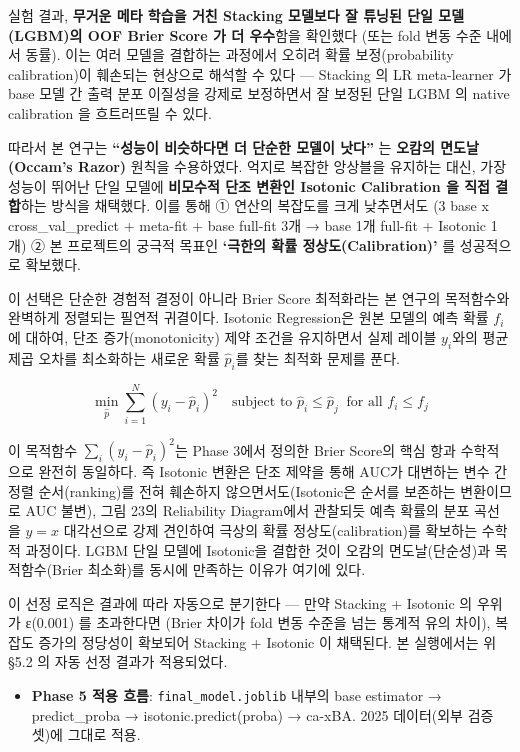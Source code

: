 \documentclass[
  11.5pt,
]{article}
\providecommand{\tightlist}{%
  \setlength{\itemsep}{0pt}\setlength{\parskip}{0pt}}
\begin{document}
실험 결과, \textbf{무거운 메타 학습을 거친 Stacking 모델보다 잘 튜닝된
단일 모델(LGBM)의 OOF Brier Score 가 더 우수}함을 확인했다 (또는 fold
변동 수준 내에서 동률). 이는 여러 모델을 결합하는 과정에서 오히려 확률
보정(probability calibration)이 훼손되는 현상으로 해석할 수 있다 ---
Stacking 의 LR meta-learner 가 base 모델 간 출력 분포 이질성을 강제로
보정하면서 잘 보정된 단일 LGBM 의 native calibration 을 흐트러뜨릴 수
있다.

따라서 본 연구는 \textbf{``성능이 비슷하다면 더 단순한 모델이 낫다''} 는
\textbf{오캄의 면도날(Occam's Razor)} 원칙을 수용하였다. 억지로 복잡한
앙상블을 유지하는 대신, 가장 성능이 뛰어난 단일 모델에 \textbf{비모수적
단조 변환인 Isotonic Calibration 을 직접 결합}하는 방식을 채택했다. 이를
통해 ① 연산의 복잡도를 크게 낮추면서도 (3 base x cross\_val\_predict +
meta-fit + base full-fit 3개 → base 1개 full-fit + Isotonic 1개) ② 본
프로젝트의 궁극적 목표인 \textbf{`극한의 확률 정상도(Calibration)'} 를
성공적으로 확보했다.

이 선택은 단순한 경험적 결정이 아니라 Brier Score 최적화라는 본 연구의
목적함수와 완벽하게 정렬되는 필연적 귀결이다. Isotonic Regression은 원본
모델의 예측 확률 \(f_i\)에 대하여, 단조 증가(monotonicity) 제약 조건을
유지하면서 실제 레이블 \(y_i\)와의 평균 제곱 오차를 최소화하는 새로운
확률 \(\hat{p}_i\)를 찾는 최적화 문제를 푼다.

\[\min_{\hat{p}} \sum_{i=1}^{N} (y_i - \hat{p}_i)^2 \quad \text{subject to } \hat{p}_i \le \hat{p}_j \ \text{ for all } f_i \le f_j\]

이 목적함수 \(\sum_i (y_i - \hat{p}_i)^2\)는 Phase 3에서 정의한 Brier
Score의 핵심 항과 수학적으로 완전히 동일하다. 즉 Isotonic 변환은 단조
제약을 통해 AUC가 대변하는 변수 간 정렬 순서(ranking)를 전혀 훼손하지
않으면서도(Isotonic은 순서를 보존하는 변환이므로 AUC 불변), 그림 23의
Reliability Diagram에서 관찰되듯 예측 확률의 분포 곡선을 \(y = x\)
대각선으로 강제 견인하여 극상의 확률 정상도(calibration)를 확보하는
수학적 과정이다. LGBM 단일 모델에 Isotonic을 결합한 것이 오캄의
면도날(단순성)과 목적함수(Brier 최소화)를 동시에 만족하는 이유가 여기에
있다.

이 선정 로직은 결과에 따라 자동으로 분기한다 --- 만약 Stacking +
Isotonic 의 우위가 ε(0.001) 를 초과한다면 (Brier 차이가 fold 변동 수준을
넘는 통계적 유의 차이), 복잡도 증가의 정당성이 확보되어 Stacking +
Isotonic 이 채택된다. 본 실행에서는 위 §5.2 의 자동 선정 결과가
적용되었다.

\begin{itemize}
\tightlist
\item
  \textbf{Phase 5 적용 흐름}: \texttt{final\_model.joblib} 내부의 base
  estimator → predict\_proba → isotonic.predict(proba) → ca-xBA. 2025
  데이터(외부 검증 셋)에 그대로 적용.
\end{itemize}
\end{document}
